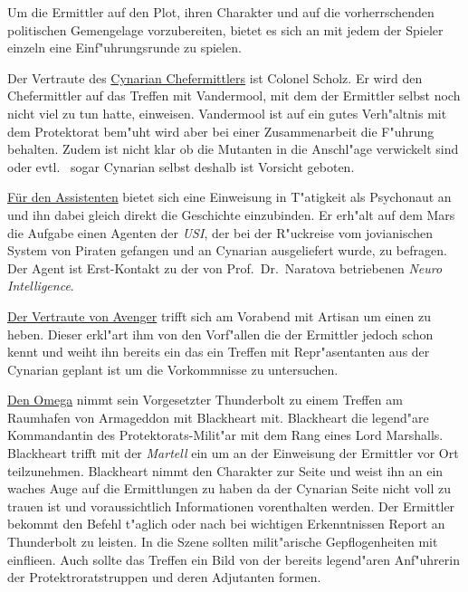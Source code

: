 
Um die Ermittler auf den Plot, ihren Charakter und auf die vorherrschenden politischen Gemengelage vorzubereiten, bietet es sich an mit jedem der Spieler einzeln eine Einf"uhrungsrunde zu spielen.

Der Vertraute des \underline{Cynarian Chefermittlers} ist Colonel Scholz. Er wird den Chefermittler auf das Treffen mit Vandermool, mit dem der Ermittler selbst noch nicht viel zu tun hatte, einweisen. Vandermool ist auf ein gutes Verh"altnis mit dem Protektorat bem"uht wird aber bei einer Zusammenarbeit die F"uhrung behalten. Zudem ist nicht klar ob die Mutanten in die Anschl"age verwickelt sind oder evtl. ~sogar Cynarian selbst deshalb ist Vorsicht geboten.

\underline{Für den Assistenten} bietet sich eine Einweisung in T"atigkeit als Psychonaut an und ihn dabei gleich direkt die Geschichte einzubinden. Er erh"alt auf dem Mars die Aufgabe einen Agenten der \emph{USI}, der bei der R"uckreise vom jovianischen System von Piraten gefangen und an Cynarian ausgeliefert wurde, zu befragen. Der Agent ist Erst-Kontakt zu der von Prof.~Dr.~Naratova betriebenen \emph{Neuro Intelligence}.

\underline{Der Vertraute von Avenger} trifft sich am Vorabend mit Artisan um einen zu heben. Dieser erkl"art ihm von den Vorf"allen die der Ermittler jedoch schon kennt und weiht ihn bereits ein das ein Treffen mit Repr"asentanten aus der Cynarian geplant ist um die Vorkommnisse zu untersuchen.

\underline{Den Omega} nimmt sein Vorgesetzter Thunderbolt zu einem Treffen am Raumhafen von Armageddon mit Blackheart mit. Blackheart die legend"are Kommandantin des Protektorats-Milit"ar mit dem Rang eines Lord Marshalls. Blackheart trifft mit der \emph{Martell} ein um an der Einweisung der Ermittler vor Ort teilzunehmen. Blackheart nimmt den Charakter zur Seite und weist ihn an ein waches Auge auf die Ermittlungen zu haben da der Cynarian Seite nicht voll zu trauen ist und voraussichtlich Informationen vorenthalten werden.
Der Ermittler bekommt den Befehl t"aglich oder nach bei wichtigen Erkenntnissen Report an Thunderbolt zu leisten. In die Szene sollten milit"arische Gepflogenheiten mit einflie\3en. Auch sollte das Treffen ein Bild von der bereits legend"aren Anf"uhrerin der Protektroratstruppen und deren Adjutanten formen.




